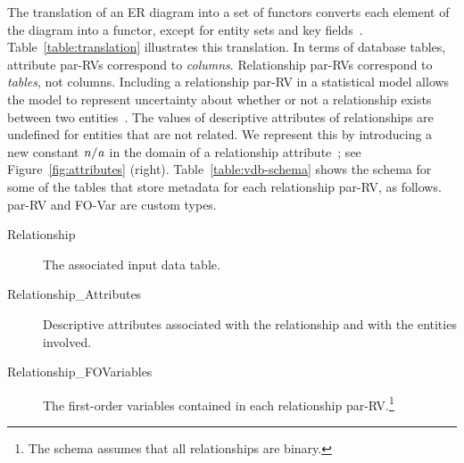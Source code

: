 The translation of an ER diagram into a set of functors converts each element of the diagram into a functor, except for entity sets and key fields~\cite{Heckerman+al:SRL07}. Table~\ref{table:translation} illustrates this translation. In terms of database tables, attribute par-RVs correspond to {\em columns}. Relationship par-RVs correspond to {\em tables}, not columns. Including a relationship par-RV in a statistical model allows the model to represent uncertainty about whether or not a relationship exists between two entities~\cite{Kimmig2015}. The values of descriptive attributes of relationships are undefined for entities that are not related. We represent this by introducing a new constant $\it{n/a}$ in the domain of a relationship attribute~\cite{Milch2005}; see Figure~\ref{fig:attributes} (right). Table~\ref{table:vdb-schema} shows the schema for some of the tables that store metadata for 
each relationship par-RV, as follows. par-RV and FO-Var are custom types.

\begin{description}
\item[Relationship] The associated input data table.
\item[Relationship\_Attributes] Descriptive attributes associated with the relationship and with the entities involved.
\item[Relationship\_FOVariables] The first-order variables contained in each relationship par-RV.\footnote{The schema assumes that all relationships are binary.}
\end{description}


